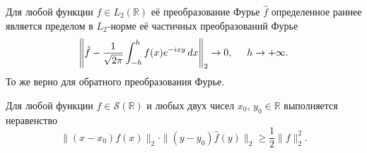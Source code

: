 \begin{to_thr}[]
    Для любой функции $f \in L_2 \left(\mathbb{R}\right)$ её преобразование Фурье $\hat{f}$ определенное раннее является пределом в $L_2$-норме её частичных преобразований Фурье
    \begin{equation*}
        \left\|
            \hat{f} - \frac{1}{\sqrt{2\pi}} \int_{-h}^{h}  f(x) e^{-ixy} \, d x
        \right\|_2 \to 0, \hspace{5 mm} h \to + \infty.
    \end{equation*}
    То же верно для обратного преобразования Фурье. 
\end{to_thr}




\begin{to_lem}
    Для любой функции $f \in \mathcal S(\mathbb{R})$ и любых двух чисел $x_0,\, y_0 \in \mathbb{R}$ выполняется неравенство
    \begin{equation*}
        \|(x-x_0) f(x)\|_2 \cdot \|(y-y_0) \hat{f} (y)\|_2 \geq \frac{1}{2} \|f\|_2^2.
    \end{equation*}
\end{to_lem}


